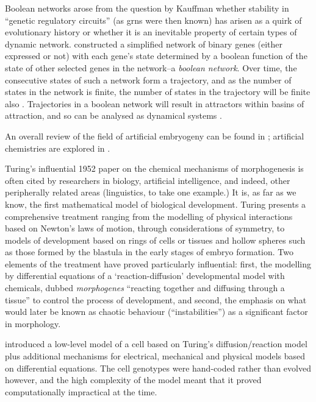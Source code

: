 Boolean networks arose from the question by Kauffman \cite{Kauffman:1969ne} whether stability in ``genetic
regulatory circuits'' (as \glspl{grn} were then known) has arisen as a quirk of evolutionary history or whether it is an
inevitable property of certain types of dynamic network. \cite{Kauffman:1969ne} constructed a simplified network of
binary genes (either expressed or not) with each gene's state determined by a boolean function of the state of other
selected genes in the network--a \emph{boolean network}. Over time, the consecutive states of such a network form a
trajectory, and as the number of states in the network is finite, the number of states in the trajectory will be finite
also \cite{De-Jong:2002jv}. Trajectories in a boolean network will result in attractors within basins of
attraction, and so can be analysed as dynamical systems \cite{Luque:1997qo,Kauffman:1969ne,Kauffman:1993kk}.

An overall review of the field of artificial embryogeny can be found in \cite{Stanley:2003fh}; artificial chemistries
are explored in \cite{Dittrich:2001zr}.

Turing's influential 1952 paper \parencite{Turing:1952qr} on the chemical mechanisms of \gls{morphogenesis}
is often cited by researchers in biology, artificial intelligence, and indeed, other peripherally related areas
(linguistics, to take one example.) It is, as far as we know, the first mathematical model of biological development.
Turing presents a comprehensive treatment ranging from the modelling of physical interactions based on Newton's laws of
motion, through considerations of symmetry, to models of development based on rings of cells or tissues and hollow
spheres such as those formed by the blastula in the early stages of embryo formation. Two elements of the treatment have
proved particularly influential: first, the modelling by differential equations of a `reaction-diffusion' developmental
model with chemicals, dubbed \emph{morphogenes} ``reacting together and diffusing through a tissue''
\parencite{Turing:1952qr} to control the process of development, and second, the emphasis on what would later be known
as chaotic behaviour (``instabilities'') as a significant factor in morphology.

\cite{Fleischer:1994kx} introduced a low-level model of a cell based on Turing's diffusion/reaction model
\parencite{Turing:1952qr} plus additional mechanisms for electrical, mechanical and physical models based on
differential equations. The cell genotypes were hand-coded rather than evolved however, and the high complexity of the
model meant that it proved computationally impractical at the time.

